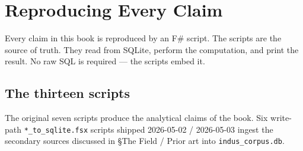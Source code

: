 \clearpage
\section{Reproducing Every Claim}\label{sec:queries}

Every claim in this book is reproduced by an F\# script. The
scripts are the source of truth. They read from SQLite, perform
the computation, and print the result. No raw SQL is required ---
the scripts embed it.

\subsection{The thirteen scripts}

The original seven scripts produce the analytical claims of the book.
Six write-path \texttt{*\_to\_sqlite.fsx} scripts shipped 2026-05-02 /
2026-05-03 ingest the secondary sources discussed in §The Field /
Prior art into \texttt{indus\_corpus.db}.

